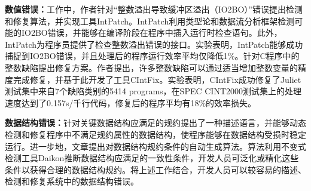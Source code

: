 \textbf{数值错误：}工作\cite{Zhang2010}中，作者针对“整数溢出导致缓冲区溢出（IO2BO）”错误提出检测和修复算法，并实现工具IntPatch。IntPatch利用类型论和数据流分析框架检测可能的IO2BO错误，并能够在编译阶段在程序中插入运行时检查语句。此外，IntPatch为程序员提供了检查整数溢出错误的接口。实验表明，IntPatch能够成功捕捉到IO2BO错误，并且处理后的程序运行效率平均仅降低1\%。\cite{7551988}针对C程序中的整数缺陷提出修复方案。作者提出，许多整数缺陷可以通过适当增加整数变量的精度完成修复，并基于此开发了工具CIntFix。实验表明，CIntFix成功修复了Juliet测试集中来自7个缺陷类别的5414 programs，在SPEC CINT2000测试集上的处理速度达到了0.157s/千行代码，修复后的程序平均有18\%的效率损失。

	


\textbf{数据结构错误：}\cite{Demsky:2003:ADR:949343.949314}针对关键数据结构应满足的规约提出了一种描述语言，并能够动态检测和修复程序中不满足规约属性的数据结构，使程序能够在数据结构受损时稳定运行。进一步地，文章\cite{Demsky:2006:IED:1146238.1146266}提出对数据结构规约条件的自动生成算法。算法利用不变式检测工具Daikon推断数据结构应满足的一致性条件，开发人员可泛化或精化这些条件以获得合理的数据结构规约。将上述工作结合，开发人员可以较容易的描述、检测和修复系统中的数据结构错误。

